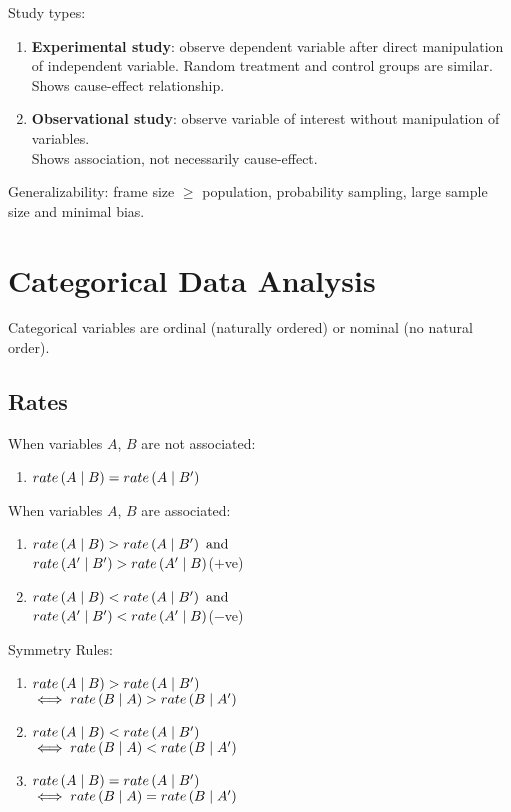 \documentclass[12pt, a4paper]{article}
\begin{document}
\begin{multicols*}{3}
Study types:
\begin{enumerate}[\roman*.]
  \item \textbf{Experimental study}: observe dependent variable after direct manipulation of independent variable. Random treatment and control groups are similar. \\Shows cause-effect relationship.
  \item \textbf{Observational study}: observe variable of interest without manipulation of variables. \\Shows association, not necessarily cause-effect. 
\end{enumerate}

Generalizability: frame size $\geq$ population, probability sampling, large sample size and minimal bias.
\colbreak
\section{Categorical Data Analysis}
Categorical variables are ordinal (naturally ordered) or nominal (no natural order).

\subsection{Rates}

When variables $A$, $B$ are not associated:
\begin{enumerate}[\roman*.]
  \item $\mathord{rate} \left( A\mid B \right) = \mathord{rate} \left( A\mid B' \right)$
\end{enumerate}

When variables $A$, $B$ are associated:
\begin{enumerate}[\roman*.]
  \item $\mathord{rate} \left( A\mid B \right) > \mathord{rate} \left( A\mid B' \right)\text{ and}$\\$\mathord{rate} \left( A'\mid B' \right) > \mathord{rate} \left( A'\mid B \right)$\hfill($+$ve)
  \item $\mathord{rate} \left( A\mid B \right) < \mathord{rate} \left( A\mid B' \right)\text{ and}$\\$\mathord{rate} \left( A'\mid B' \right) < \mathord{rate} \left( A'\mid B \right)$\hfill($-$ve)
\end{enumerate}

Symmetry Rules:
\begin{enumerate}[\roman*.]
  \item $\mathord{rate} \left( A\mid B \right) > \mathord{rate} \left( A\mid B' \right)$ \\$\iff \mathord{rate} \left( B\mid A \right) > \mathord{rate} \left( B\mid A' \right)$
  \item $\mathord{rate} \left( A\mid B \right) < \mathord{rate} \left( A\mid B' \right)$ \\$\iff \mathord{rate} \left( B\mid A \right) < \mathord{rate} \left( B\mid A' \right)$
  \item $\mathord{rate} \left( A\mid B \right) = \mathord{rate} \left( A\mid B' \right)$ \\$\iff \mathord{rate} \left( B\mid A \right) = \mathord{rate} \left( B\mid A' \right)$
\end{enumerate}


\end{multicols*}
\end{document}
